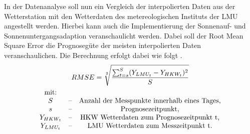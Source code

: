 In der Datenanalyse soll nun ein Vergleich der interpolierten Daten aus der Wetterstation mit den Wetterdaten des metereologischen Instituts der LMU angestellt werden. Hierbei kann auch die Implementierung der Sonnenauf- und Sonnenuntergangsadaption veranschaulicht werden. Dabei soll der Root Mean Square Error die Prognosegüte der meisten interpolierten Daten veranschaulichen. Die Berechnung erfolgt dabei wie folgt \cite{Armstrong.1992}.
\begin{gather} 
RMSE = \sqrt[2]{\frac{\sum_{t=s}^{S}(Y_{LMU_{t}}-Y_{HKW_{t}})^2}{S}}\\
\begin{matrix} 
   \text{mit:} &&\\ 
   S & \text{--} & \text{Anzahl der Messpunkte innerhalb eines Tages,} \\ 
   s & \text{--} & \text{Prognosezeitpunkt,} \\
   Y_{HKW_{t}} & \text{--} & \text{HKW Wetterdaten zum Prognosezeitpunkt t,} \\ 
   Y_{LMU_{t}} & \text{--} & \text{LMU Wetterdaten zum Messzeitpunkt t.} \\ 
\end{matrix}\notag 
\end{gather} 

